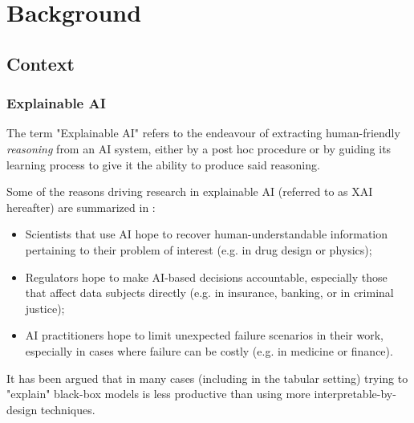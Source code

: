 \documentclass[../main.tex]{subfiles}
\begin{document}
\chapter{Background}
\label{ch:background}


\section{Context}

\subsection{Explainable AI}

The term "Explainable AI" refers to the endeavour of extracting human-friendly \emph{reasoning} from an AI system, either by a post hoc procedure or by guiding its learning process to give it the ability to produce said reasoning\citenote{}.

Some of the reasons driving research in explainable AI (referred to as XAI hereafter) are summarized in \cite{zhangSurvey2021}:
\begin{itemize}
    \item Scientists that use AI hope to recover human-understandable information pertaining to their problem of interest (e.g. in drug design or physics);
    \item Regulators hope to make AI-based decisions accountable, especially those that affect data subjects directly (e.g. in insurance, banking, or in criminal justice);
    \item AI practitioners hope to limit unexpected failure scenarios in their work, especially in cases where failure can be costly (e.g. in medicine or finance).
\end{itemize}

It has been argued \cite{rudinWhy2019} that in many cases (including in the tabular setting) trying to "explain" black-box models is less productive than using more interpretable-by-design techniques.
\end{document}

